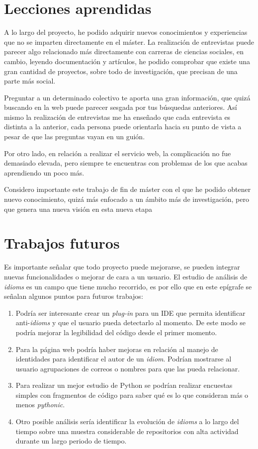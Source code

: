 \documentclass[a4paper, 12pt]{book}
\begin{document}
\section{Lecciones aprendidas}
\label{sec:lecciones_aprendidas}

A lo largo del proyecto, he podido adquirir nuevos conocimientos y experiencias que no se imparten directamente en el máster. 
La realización de entrevistas puede parecer algo relacionado más directamente con carreras de ciencias sociales, en cambio, leyendo documentación y artículos, he podido comprobar que existe una gran cantidad de proyectos, sobre todo de investigación, que precisan de una parte más social.

Preguntar a un determinado colectivo te aporta una gran información, que quizá buscando en la web puede parecer sesgada por tus búsquedas anteriores. Así mismo la realización de entrevistas me ha enseñado que cada entrevista es distinta a la anterior, cada persona puede orientarla hacia su punto de vista a pesar de que las preguntas vayan en un guión.

Por otro lado, en relación a realizar el servicio web, la complicación no fue demasiado elevada, pero siempre te encuentras con problemas de los que acabas aprendiendo un poco más.

Considero importante este trabajo de fin de máster con el que he podido obtener nuevo conocimiento, quizá más enfocado a un ámbito más de investigación, pero que genera una nueva visión en esta nueva etapa


\section{Trabajos futuros}
\label{sec:trabajos_futuros}

Es importante señalar que todo proyecto puede mejorarse, se pueden integrar nuevas funcionalidades o mejorar de cara a un usuario. El estudio de análisis de \textit{idioms} es un campo que tiene mucho recorrido, es por ello que en este epígrafe se señalan algunos puntos para futuros trabajos:
\begin{enumerate}
    \item Podría ser interesante crear un\textit{ plug-in} para un IDE que permita identificar anti-\textit{idioms} y que el usuario pueda detectarlo al momento. De este modo se podría mejorar la legibilidad del código desde el primer momento.
    \item Para la página web podría haber mejoras en relación al manejo de identidades para identificar el autor de un \textit{idiom}. Podrían mostrarse al usuario agrupaciones de correos o nombres para que las pueda relacionar.
    \item Para realizar un mejor estudio de Python se podrían realizar encuestas simples con fragmentos de código para saber qué es lo que consideran más o menos \textit{pythonic}.
    \item Otro posible análisis sería identificar la evolución de \textit{idioms} a lo largo del tiempo sobre una muestra considerable de repositorios con alta actividad durante un largo periodo de tiempo.
\end{enumerate}
\end{document}
